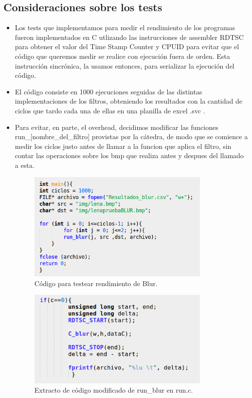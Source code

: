 \subsection{Consideraciones sobre los tests}

\begin{itemize}

\item {Los tests que implementamos para medir el rendimiento de los programas fueron implementados en C utlizando las instrucciones de assembler RDTSC para obtener el valor del Time Stamp Counter y CPUID para evitar que el código que queremos medir se realice con ejecución fuera de orden. Esta instrucción sincrónica, la usamos entonces, para serializar la ejecución del código.}

\item {El código consiste en 1000 ejecuciones seguidas de las distintas implementaciones de los filtros, obteniendo los resultados con la cantidad de ciclos que tardo cada una de ellas en una planilla de excel .svc .}

\item {Para evitar, en parte, el overhead, decidimos modificar las funciones run_[nombre_del_filtro] provistas por la cátedra, de modo que se comience a medir los ciclos justo antes de llamar a la funcion que aplica el filtro, sin contar las operaciones sobre los bmp que realiza antes y despues del llamado a esta. }

\begin{figure}[ht!]
\centering
\includegraphics[width=90mm]{imagenes/resultados/codigoblur.png}
\caption{Código para testear rendimiento de Blur.}
\end{figure}

\begin{figure}[ht!]
\centering
\includegraphics[width=90mm]{imagenes/resultados/codigoblur2.png}
\caption{Extracto de código modificado de run_blur en run.c.}
\end{figure}


\end{itemize}
